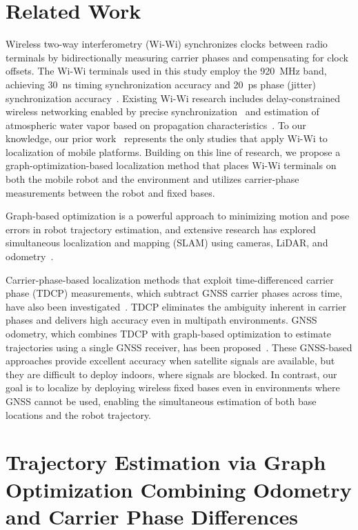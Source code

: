 \documentclass[conference]{IEEEtran}
\begin{document}
\section{Related Work}
Wireless two-way interferometry (Wi-Wi) synchronizes clocks between radio terminals by bidirectionally measuring carrier phases and compensating for clock offsets.
The Wi-Wi terminals used in this study employ the 920~MHz band, achieving 30~ns timing synchronization accuracy and 20~ps phase (jitter) synchronization accuracy~\cite{ouchi2024evaluation}.
Existing Wi-Wi research includes delay-constrained wireless networking enabled by precise synchronization~\cite{Yamasaki2021} and estimation of atmospheric water vapor based on propagation characteristics~\cite{Yasuda2019}.
To our knowledge, our prior work~\cite{rsj2021_nara,rsj2022_nara,ziku2023_nara} represents the only studies that apply Wi-Wi to localization of mobile platforms.
Building on this line of research, we propose a graph-optimization-based localization method that places Wi-Wi terminals on both the mobile robot and the environment and utilizes carrier-phase measurements between the robot and fixed bases.

Graph-based optimization is a powerful approach to minimizing motion and pose errors in robot trajectory estimation, and extensive research has explored simultaneous localization and mapping (SLAM) using cameras, LiDAR, and odometry~\cite{grisetti2010tutorial,graph_slam_urban_mapping,graph_slam_2012}.

Carrier-phase-based localization methods that exploit time-differenced carrier phase (TDCP) measurements, which subtract GNSS carrier phases across time, have also been investigated~\cite{TDCP2008,TDCP2022}.
TDCP eliminates the ambiguity inherent in carrier phases and delivers high accuracy even in multipath environments.
GNSS odometry, which combines TDCP with graph-based optimization to estimate trajectories using a single GNSS receiver, has been proposed~\cite{suzuki2022gnss}.
These GNSS-based approaches provide excellent accuracy when satellite signals are available, but they are difficult to deploy indoors, where signals are blocked.
In contrast, our goal is to localize by deploying wireless fixed bases even in environments where GNSS cannot be used, enabling the simultaneous estimation of both base locations and the robot trajectory.

\section{Trajectory Estimation via Graph Optimization Combining Odometry and Carrier Phase Differences}
\end{document}
